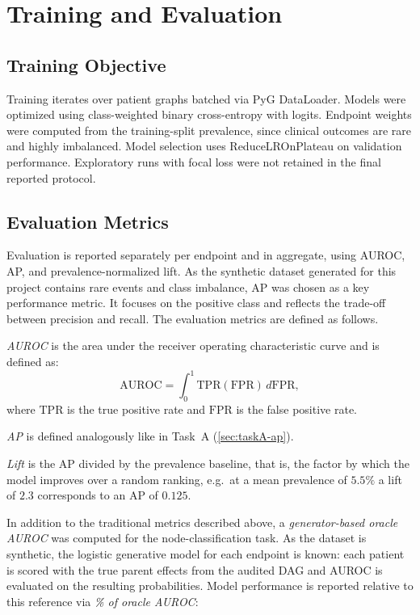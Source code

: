 \section{Training and Evaluation}
\label{sec:taskB-train-eval}

\subsection{Training Objective}
\label{sec:taskB-train-obj}

Training iterates over patient graphs batched via PyG DataLoader.
Models were optimized using class-weighted binary cross-entropy with logits.
Endpoint weights were computed from the training-split prevalence, since clinical outcomes are rare and highly imbalanced.
Model selection uses ReduceLROnPlateau on validation performance.
Exploratory runs with focal loss were not retained in the final reported protocol.

\subsection{Evaluation Metrics}
\label{sec:taskB-metrics}

Evaluation is reported separately per endpoint and in aggregate, using AUROC, AP, and prevalence-normalized lift.
As the synthetic dataset generated for this project contains rare events and class imbalance, AP was chosen as a key performance metric.
It focuses on the positive class and reflects the trade-off between precision and recall.
The evaluation metrics are defined as follows.

\emph{AUROC} is the area under the receiver operating characteristic curve and is defined as:
\begin{equation}
\mathrm{AUROC}
=
\int_0^1 \mathrm{TPR}(\mathrm{FPR})\,d\mathrm{FPR},
\end{equation}
where $\mathrm{TPR}$ is the true positive rate and $\mathrm{FPR}$ is the false positive rate.

\emph{AP} is defined analogously like in Task~A (\cref{sec:taskA-ap}).

\emph{Lift} is the AP divided by the prevalence baseline, that is, the
factor by which the model improves over a random ranking, e.g.\ at a mean
prevalence of $5.5\%$ a lift of $2.3$ corresponds to an AP of $0.125$.

In addition to the traditional metrics described above, a
\emph{generator-based oracle AUROC} was computed for the node-classification
task. As the dataset is synthetic, the logistic generative model for
each endpoint is known: each patient is scored with the true parent effects
from the audited DAG and AUROC is evaluated on the resulting
probabilities. Model performance is reported relative to this reference via
\emph{\% of oracle AUROC}:

